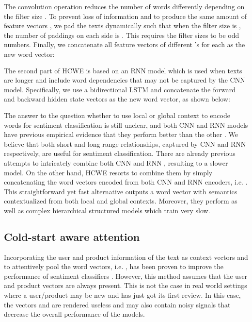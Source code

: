 \documentclass[11pt,a4paper]{article}
\begin{document}
The convolution operation reduces the number of words differently depending on the filter size . To prevent loss of information and to produce the same amount of feature vectors , we pad the texts dynamically such that when the filter size is , the number of paddings on each side is .
This requires the filter sizes to be odd numbers.
Finally, we concatenate all feature vectors of different 's for each  as the new word vector:




The second part of HCWE is based on an RNN model which is used when texts are longer and include word dependencies that may not be captured by the CNN model. Specifically, we use a bidirectional LSTM and concatenate the forward and backward hidden state vectors as the new word vector, as shown below:




The answer to the question whether to use local or global context to encode words for sentiment classification is still unclear, and both CNN and RNN models have previous empirical evidence that they perform better than the other \cite{Kim2014ConvolutionalNN,mccann2017learned}. We believe that both short and long range relationships, captured by CNN and RNN respectively, are useful for sentiment classification. There are already previous attempts to intricately combine both CNN and RNN \cite{zhou2016text}, resulting to a slower model. On the other hand, HCWE resorts to combine them by simply concatenating the word vectors encoded from both CNN and RNN encoders, i.e. . This straightforward yet fast alternative outputs a word vector with semantics contextualized from both local and global contexts. Moreover, they perform as well as complex hierarchical structured models \cite{yang2016hierarchical,chen2016neural} which train very slow.

\subsection{Cold-start aware attention}

Incorporating the user and product information of the text as context vectors  and  to attentively pool the word vectors, i.e. , has been proven to improve the performance of sentiment classifiers \cite{chen2016neural}. However, this method assumes that the user and product vectors are always present. This is not the case in real world settings where a user/product may be new and has just got its first review. In this case, the vectors  and  are rendered useless and may also contain noisy signals that decrease the overall performance of the models.
\end{document}
